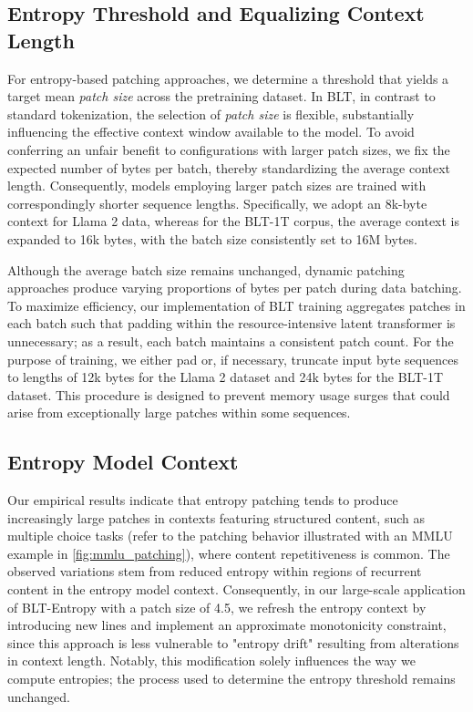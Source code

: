 \subsection{Entropy Threshold and Equalizing Context Length} For entropy-based patching approaches, we determine a threshold that yields a target mean \textit{patch size} across the pretraining dataset. In {\textsc BLT}, in contrast to standard tokenization, the selection of \textit{patch size} is flexible, substantially influencing the effective context window available to the model. To avoid conferring an unfair benefit to configurations with larger patch sizes, we fix the expected number of bytes per batch, thereby standardizing the average context length. Consequently, models employing larger patch sizes are trained with correspondingly shorter sequence lengths. Specifically, we adopt an 8k-byte context for Llama 2 data, whereas for the {\textsc BLT}-1T corpus, the average context is expanded to 16k bytes, with the batch size consistently set to 16M bytes.

Although the average batch size remains unchanged, dynamic patching approaches produce varying proportions of bytes per patch during data batching. To maximize efficiency, our implementation of {\textsc BLT} training aggregates patches in each batch such that padding within the resource-intensive latent transformer is unnecessary; as a result, each batch maintains a consistent patch count. For the purpose of training, we either pad or, if necessary, truncate input byte sequences to lengths of 12k bytes for the Llama 2 dataset and 24k bytes for the {\textsc BLT}-1T dataset. This procedure is designed to prevent memory usage surges that could arise from exceptionally large patches within some sequences.

\subsection{Entropy Model Context}
\label{section:entropy-context}
Our empirical results indicate that entropy patching tends to produce increasingly large patches in contexts featuring structured content, such as multiple choice tasks (refer to the patching behavior illustrated with an MMLU example in \autoref{fig:mmlu_patching}), where content repetitiveness is common. The observed variations stem from reduced entropy within regions of recurrent content in the entropy model context. Consequently, in our large-scale application of {\textsc BLT}-Entropy with a patch size of 4.5, we refresh the entropy context by introducing new lines and implement an approximate monotonicity constraint, since this approach is less vulnerable to "entropy drift" resulting from alterations in context length. Notably, this modification solely influences the way we compute entropies; the process used to determine the entropy threshold remains unchanged.

